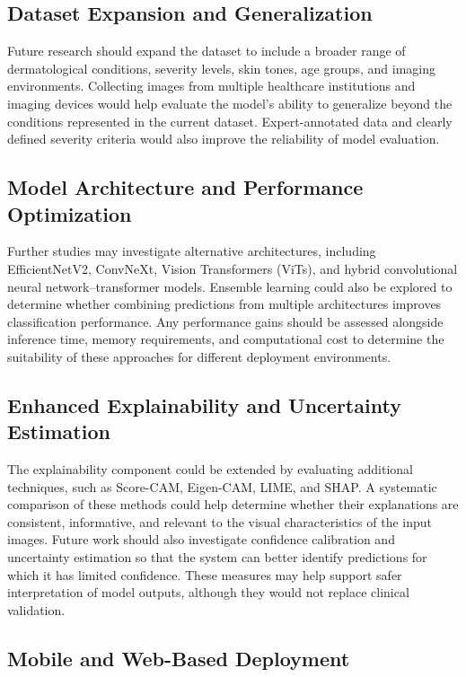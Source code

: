 \subsection{Dataset Expansion and Generalization}

Future research should expand the dataset to include a broader range of dermatological conditions, severity levels, skin tones, age groups, and imaging environments. Collecting images from multiple healthcare institutions and imaging devices would help evaluate the model's ability to generalize beyond the conditions represented in the current dataset. Expert-annotated data and clearly defined severity criteria would also improve the reliability of model evaluation.

\subsection{Model Architecture and Performance Optimization}

Further studies may investigate alternative architectures, including EfficientNetV2, ConvNeXt, Vision Transformers (ViTs), and hybrid convolutional neural network--transformer models. Ensemble learning could also be explored to determine whether combining predictions from multiple architectures improves classification performance. Any performance gains should be assessed alongside inference time, memory requirements, and computational cost to determine the suitability of these approaches for different deployment environments.

\subsection{Enhanced Explainability and Uncertainty Estimation}

The explainability component could be extended by evaluating additional techniques, such as Score-CAM, Eigen-CAM, LIME, and SHAP. A systematic comparison of these methods could help determine whether their explanations are consistent, informative, and relevant to the visual characteristics of the input images. Future work should also investigate confidence calibration and uncertainty estimation so that the system can better identify predictions for which it has limited confidence. These measures may help support safer interpretation of model outputs, although they would not replace clinical validation.

\subsection{Mobile and Web-Based Deployment}

